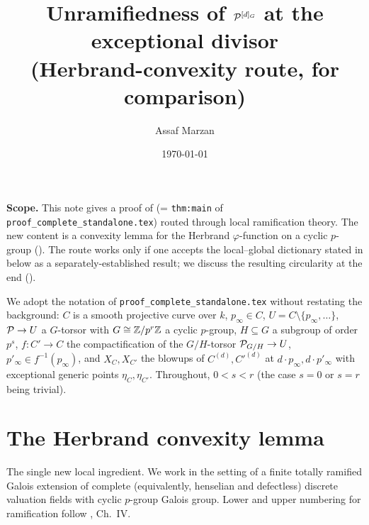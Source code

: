 \documentclass[11pt]{article}
\title{Unramifiedness of $\mathcal{P}^{[d]_G}$ at the exceptional divisor\\[2pt]
       {\large (Herbrand-convexity route, for comparison)}}
\author{Assaf Marzan}
\date{\today}
\begin{document}
\maketitle

\noindent
\textbf{Scope.} This note gives a proof of  (= \texttt{thm:main}
of \texttt{proof\_complete\_standalone.tex}) routed through local ramification
theory. The new content is a convexity lemma for the Herbrand $\varphi$-function
on a cyclic $p$-group (). The route works only if
one accepts the local--global dictionary stated in  below
as a separately-established result; we discuss the resulting circularity at the
end ().

We adopt the notation of \texttt{proof\_complete\_standalone.tex} without
restating the background: $C$ is a smooth projective curve over $k$, $p_\infty
\in C$, $U = C \setminus \{p_\infty,\ldots\}$, $\mathcal{P} \to U$ a $G$-torsor with
$G \cong \mathbb{Z}/p^r\mathbb{Z}$ a cyclic $p$-group, $H \subseteq G$ a subgroup of order
$p^s$, $f \colon C' \to C$ the compactification of the $G/H$-torsor
$\mathcal{P}_{G/H} \to U$, $p'_\infty \in f^{-1}(p_\infty)$, and $X_C, X_{C'}$ the
blowups of $C^{(d)}, C'^{(d)}$ at $d\cdot p_\infty, d \cdot p'_\infty$ with
exceptional generic points $\eta_C, \eta_{C'}$. Throughout, $0 < s < r$
(the case $s = 0$ or $s = r$ being trivial).

\section{The Herbrand convexity lemma}\label{sec:herbrand}

The single new local ingredient. We work in the setting of a finite totally
ramified Galois extension of complete (equivalently, henselian and defectless)
discrete valuation fields with cyclic $p$-group Galois group. Lower and upper
numbering for ramification follow \cite{Serre1979}, Ch.~IV.
\end{document}
